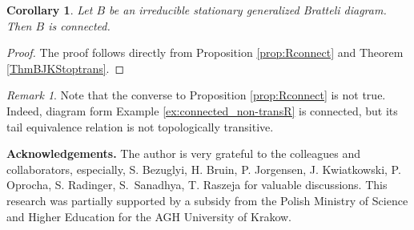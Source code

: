 \documentclass[11pt, twoside]{amsart}
\theoremstyle{definition}
\theoremstyle{remark}
\newtheorem{remark}[definition]{Remark}
\theoremstyle{plain}
\newtheorem{corol}[definition]{Corollary}
\numberwithin{equation}{section}
\begin{document}
\begin{corol}
    Let $B$ be an irreducible stationary generalized Bratteli diagram. Then $B$ is connected.
\end{corol}

\begin{proof}
    The proof follows directly from Proposition \ref{prop:Rconnect} and Theorem \ref{ThmBJKStoptrans}.%
\end{proof}

\begin{remark}
    Note that the converse to Proposition \ref{prop:Rconnect} is not true. Indeed, diagram form Example \ref{ex:connected_non-transR} is connected, but its tail equivalence relation is not topologically transitive.
\end{remark}






\textbf{Acknowledgements.} The author is very grateful to the colleagues and collaborators, 
especially, S. Bezuglyi, H. Bruin, P. Jorgensen, J. Kwiatkowski, P. Oprocha, S. Radinger, S.~Sanadhya, T. Raszeja  for valuable discussions.
This research was partially supported by a subsidy from the Polish Ministry of Science and Higher Education for the AGH University of Krakow.



\end{document}
